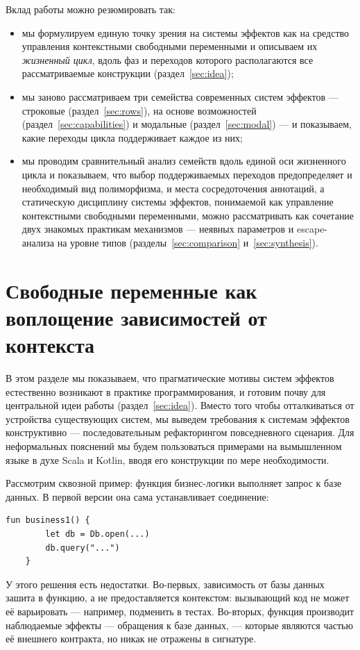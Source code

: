 \documentclass{ProcISPRAS}
\begin{document}
Вклад работы можно резюмировать так:
\begin{itemize}
    \item мы формулируем единую точку зрения на системы эффектов как на средство
    управления контекстными свободными переменными и описываем их
    \emph{жизненный цикл}, вдоль фаз и переходов которого располагаются все рассматриваемые конструкции
    (раздел~\ref{sec:idea});
    \item мы заново рассматриваем три семейства современных систем эффектов ---
    строковые (раздел~\ref{sec:rows}), на основе возможностей
    (раздел~\ref{sec:capabilities}) и модальные (раздел~\ref{sec:modal}) ---
    и показываем, какие переходы цикла поддерживает каждое из них;
    \item мы проводим сравнительный анализ семейств вдоль единой оси жизненного цикла и показываем,
    что выбор поддерживаемых переходов предопределяет и необходимый вид полиморфизма, и места
    сосредоточения аннотаций, а статическую дисциплину системы эффектов, понимаемой как
    управление контекстными свободными переменными, можно
    рассматривать как сочетание двух знакомых практикам механизмов --- неявных параметров
    и escape-анализа на уровне типов (разделы~\ref{sec:comparison} и~\ref{sec:synthesis}).
\end{itemize}


\section{Свободные переменные как воплощение зависимостей от контекста}\label{sec:es-intro}

В этом разделе мы показываем, что прагматические мотивы систем эффектов естественно
возникают в практике программирования, и готовим почву для центральной идеи
работы (раздел~\ref{sec:idea}).
Вместо того
чтобы отталкиваться от устройства существующих систем, мы выведем требования к системам
эффектов конструктивно --- последовательным рефакторингом повседневного сценария.
Для неформальных пояснений мы будем пользоваться примерами на вымышленном языке в духе Scala и Kotlin,
вводя его конструкции по мере необходимости.

Рассмотрим сквозной пример: функция бизнес-логики выполняет запрос к базе данных. В
первой версии она сама устанавливает соединение:
\begin{lstlisting}[language=colang]
    fun business1() {
        let db = Db.open(...)
        db.query("...")
    }
\end{lstlisting}
У этого решения есть недостатки. Во-первых, зависимость от базы данных зашита в функцию, а не
предоставляется контекстом: вызывающий код не может её варьировать --- например,
подменить в тестах. Во-вторых, функция производит наблюдаемые
эффекты --- обращения к базе данных, --- которые являются частью её внешнего контракта, но
никак не отражены в сигнатуре.
\end{document}

